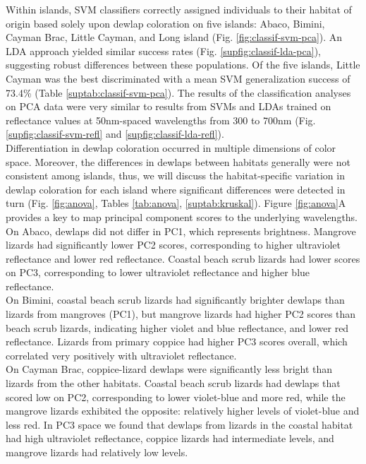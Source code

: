 Within islands, SVM classifiers correctly assigned individuals to their habitat of origin based solely upon dewlap coloration on five islands: Abaco, Bimini, Cayman Brac, Little Cayman, and Long island (Fig. \ref{fig:classif-svm-pca}). An LDA approach yielded similar success rates (Fig. \ref{supfig:classif-lda-pca}), suggesting robust differences between these populations. Of the five islands, Little Cayman was the best discriminated with a mean SVM generalization success of 73.4\% (Table \ref{suptab:classif-svm-pca}). The results of the classification analyses on PCA data were very similar to results from SVMs and LDAs trained on reflectance values at 50nm-spaced wavelengths from 300 to 700nm (Fig. \ref{supfig:classif-svm-refl} and \ref{supfig:classif-lda-refl}).\\

Differentiation in dewlap coloration occurred in multiple dimensions of color space. Moreover, the differences in dewlaps between habitats generally were not consistent among islands, thus, we will discuss the habitat-specific variation in dewlap coloration for each island where significant differences were detected in turn (Fig. \ref{fig:anova}, Tables \ref{tab:anova}, \ref{suptab:kruskal}). Figure \ref{fig:anova}A provides a key to map principal component scores to the underlying wavelengths.\\

On Abaco, dewlaps did not differ in PC1, which represents brightness. Mangrove lizards had significantly lower PC2 scores, corresponding to higher ultraviolet reflectance and lower red reflectance. Coastal beach scrub lizards had lower scores on PC3, corresponding to lower ultraviolet reflectance and higher blue reflectance.\\

On Bimini, coastal beach scrub lizards had significantly brighter dewlaps than lizards from mangroves (PC1), but mangrove lizards had higher PC2 scores than beach scrub lizards, indicating higher violet and blue reflectance, and lower red reflectance. Lizards from primary coppice had higher PC3 scores overall, which correlated very positively with ultraviolet reflectance.\\

On Cayman Brac, coppice-lizard dewlaps were significantly less bright than lizards from the other habitats. Coastal beach scrub lizards had dewlaps that scored low on PC2, corresponding to lower violet-blue and more red, while the mangrove lizards exhibited the opposite: relatively higher levels of violet-blue and less red. In PC3 space we found that dewlaps from lizards in the coastal habitat had high ultraviolet reflectance, coppice lizards had intermediate levels, and mangrove lizards had relatively low levels.\\


